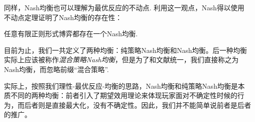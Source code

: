 同样，Nash均衡也可以理解为最优反应的不动点. 利用这一观点，Nash得以使用不动点定理证明了Nash均衡的存在性：
\begin{theorem}[Nash均衡存在性定理]
任意有限正则形式博弈都存在一个Nash均衡.
\end{theorem}

\begin{remark}
    目前为止，我们一共定义了两种均衡：纯策略Nash均衡和Nash均衡。后一种均衡实际上应该被称作\emph{混合策略Nash均衡}，但是为了和文献统一，我们直接称之为Nash均衡，而忽略前缀“混合策略”.

    实际上，按照我们理性-最优反应-均衡的思路，Nash均衡和纯策略Nash均衡是本质不同的两种均衡：前者引入了期望效用理论来体现玩家面对不确定性时候的行为，而后者则是直接最大化，没有不确定性。因此，我们并不能简单说前者是后者的推广。
\end{remark}

